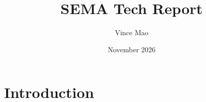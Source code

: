 \documentclass{article}
\title{SEMA Tech Report}
\author{Vince Mao}
\date{November 2026}
\begin{document}
\maketitle

\section{Introduction}
\end{document}
